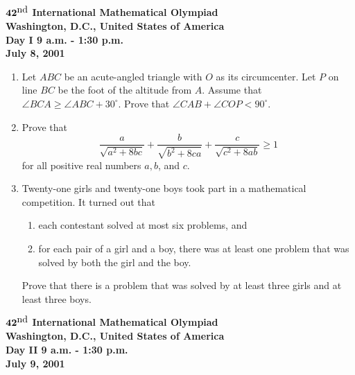 \documentclass[12pt]{article}
\def\nd{^{\scriptstyle\mbox{nd}}}
\def\ang{\angle}
\def\dg{^\circ}
\def\be{\begin{enumerate}}
\def\ee{\end{enumerate}}
\def\ii{\item}
\begin{document}
\begin{center}
${\bf 42\nd}$ {\bf International Mathematical Olympiad} \\[.1in]
{\bf Washington, D.C., United States of America} \\ [.05in]
{\bf Day I \hspace{.25in} 9 a.m. - 1:30 p.m.}\\[.05in]
{\bf July 8, 2001}
\end{center}

\vspace*{.3in}

\begin{enumerate}
\item %
Let $ABC$ be an acute-angled triangle with $O$ as its circumcenter. Let
$P$ on line $BC$ be the foot of the altitude from $A$. Assume that $\ang
BCA \ge \ang ABC + 30\dg$. Prove that $\ang CAB + \ang COP < 90\dg$. 

\item %
Prove that 
\[
\frac{a}{\sqrt{a^2+8bc}} + \frac{b}{\sqrt{b^2+8ca}} + 
\frac{c}{\sqrt{c^2+8ab}} \ge 1
\]
for all positive real numbers $a, b$, and $c$.

\item %
Twenty-one girls and twenty-one boys took part in a mathematical
competition. It turned out that
\be
\ii[(a)] 
each contestant solved at most six problems, and
\ii[(b)] 
for each pair of a girl and a boy, there was at least one problem that
was solved by both the girl and the boy.
\ee
Prove that there is a problem that was solved by at least three girls and
at least three boys.
\end{enumerate}

\pagebreak %
\begin{center}
${\bf 42\nd}$ {\bf International Mathematical Olympiad} \\[.1in]
{\bf Washington, D.C., United States of America} \\ [.05in]
{\bf Day II \hspace{.25in} 9 a.m. - 1:30 p.m.}\\[.05in]
{\bf July 9, 2001}
\end{center}

\vspace*{.3in}
\end{document}
